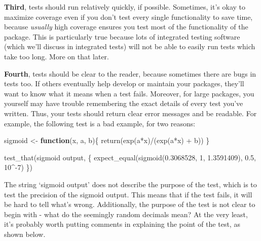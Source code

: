 \documentclass[
]{book}
\newenvironment{Shaded}{\begin{snugshade}}{\end{snugshade}}
\newcommand{\ControlFlowTok}[1]{\textcolor[rgb]{0.13,0.29,0.53}{\textbf{#1}}}
\newcommand{\DecValTok}[1]{\textcolor[rgb]{0.00,0.00,0.81}{#1}}
\newcommand{\FloatTok}[1]{\textcolor[rgb]{0.00,0.00,0.81}{#1}}
\newcommand{\FunctionTok}[1]{\textcolor[rgb]{0.00,0.00,0.00}{#1}}
\newcommand{\NormalTok}[1]{#1}
\newcommand{\OtherTok}[1]{\textcolor[rgb]{0.56,0.35,0.01}{#1}}
\newcommand{\SpecialCharTok}[1]{\textcolor[rgb]{0.00,0.00,0.00}{#1}}
\newcommand{\StringTok}[1]{\textcolor[rgb]{0.31,0.60,0.02}{#1}}
\begin{document}
\textbf{Third}, tests should run relatively quickly, if possible. Sometimes, it's okay to maximize coverage even if you don't test every single functionality to save time, because \emph{usually} high coverage ensures you test most of the functionality of the package. This is particularly true because lots of integrated testing software (which we'll discuss in integrated tests) will not be able to easily run tests which take too long. More on that later.

\textbf{Fourth}, tests should be clear to the reader, because sometimes there are bugs in tests too. If others eventually help develop or maintain your packages, they'll want to know what it means when a test fails. Moreover, for large packages, you yourself may have trouble remembering the exact details of every test you've written. Thus, your tests should return clear error messages and be readable. For example, the following test is a bad example, for two reasons:

\begin{Shaded}
\begin{Highlighting}[]
\NormalTok{sigmoid }\OtherTok{\textless{}{-}} \ControlFlowTok{function}\NormalTok{(x, a, b)\{}
  \FunctionTok{return}\NormalTok{(}\FunctionTok{exp}\NormalTok{(a}\SpecialCharTok{*}\NormalTok{x)}\SpecialCharTok{/}\NormalTok{(}\FunctionTok{exp}\NormalTok{(a}\SpecialCharTok{*}\NormalTok{x) }\SpecialCharTok{+}\NormalTok{ b))}
\NormalTok{\}}

\FunctionTok{test\_that}\NormalTok{(}\StringTok{\textquotesingle{}sigmoid output\textquotesingle{}}\NormalTok{, \{}
  \FunctionTok{expect\_equal}\NormalTok{(}\FunctionTok{sigmoid}\NormalTok{(}\FloatTok{0.3068528}\NormalTok{, }\DecValTok{1}\NormalTok{, }\FloatTok{1.3591409}\NormalTok{), }\FloatTok{0.5}\NormalTok{, }\DecValTok{10}\SpecialCharTok{\^{}{-}}\DecValTok{7}\NormalTok{)}
\NormalTok{\})}
\end{Highlighting}
\end{Shaded}

The string `sigmoid output' does not describe the purpose of the test, which is to test the precision of the sigmoid output. This means that if the test fails, it will be hard to tell what's wrong. Additionally, the purpose of the test is not clear to begin with - what do the seemingly random decimals mean? At the very least, it's probably worth putting comments in explaining the point of the test, as shown below.
\end{document}
